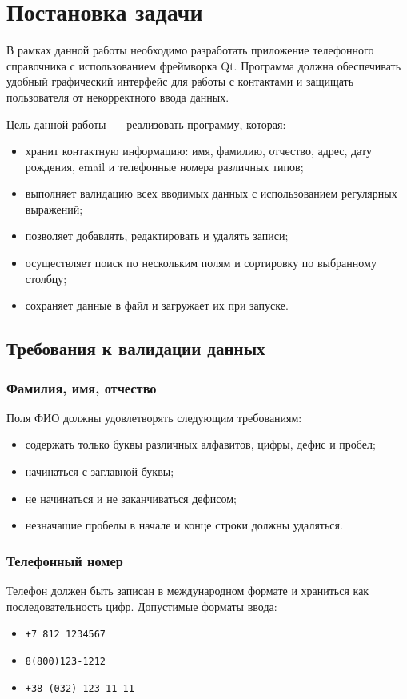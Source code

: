 \section{Постановка задачи}

В рамках данной работы необходимо разработать приложение телефонного справочника с использованием фреймворка Qt. Программа должна обеспечивать удобный графический интерфейс для работы с контактами и защищать пользователя от некорректного ввода данных.

Цель данной работы~--- реализовать программу, которая:
\begin{itemize}
    \item хранит контактную информацию: имя, фамилию, отчество, адрес, дату рождения, email и телефонные номера различных типов;
    \item выполняет валидацию всех вводимых данных с использованием регулярных выражений;
    \item позволяет добавлять, редактировать и удалять записи;
    \item осуществляет поиск по нескольким полям и сортировку по выбранному столбцу;
    \item сохраняет данные в файл и загружает их при запуске.
\end{itemize}

\subsection{Требования к валидации данных}

\subsubsection*{Фамилия, имя, отчество}
Поля ФИО должны удовлетворять следующим требованиям:
\begin{itemize}
    \item содержать только буквы различных алфавитов, цифры, дефис и пробел;
    \item начинаться с заглавной буквы;
    \item не начинаться и не заканчиваться дефисом;
    \item незначащие пробелы в начале и конце строки должны удаляться.
\end{itemize}

\subsubsection*{Телефонный номер}
Телефон должен быть записан в международном формате и храниться как последовательность цифр. Допустимые форматы ввода:
\begin{itemize}
    \item \texttt{+7 812 1234567}
    \item \texttt{8(800)123-1212}
    \item \texttt{+38 (032) 123 11 11}
\end{itemize}

